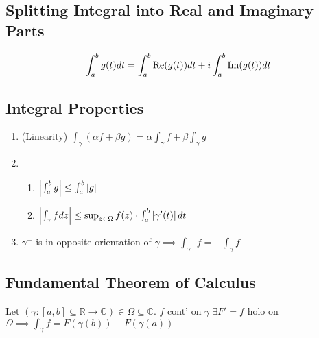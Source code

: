 \subsection{Splitting Integral into Real and Imaginary Parts} %
\label{sub:splitting_integral_into_real_and_imaginary_parts}
\begin{equation*}
	\int_{a}^{b} g(t) dt = \int_{a}^{b} \operatorname{Re}(g(t)) dt + i \int_{a}^{b} \operatorname{Im}(g(t)) dt
\end{equation*}

\subsection{Integral Properties} %
\label{sub:integral_properties}
\begin{enumerate}
	\item (Linearity) $\int_{\gamma} (\alpha f + \beta g) = \alpha \int_{\gamma} f + \beta \int_{\gamma} g$
	\item \begin{enumerate}
		\item $\left|\int_{a}^{b} g\right| \leq \int_{a}^{b} \left|g\right|$
		\item $\left|\int_{\gamma} f dz\right| \leq \sup_{z \in \Omega} f(z) \cdot \int_{a}^{b} \left|\gamma'(t)\right| dt$
	\end{enumerate}
	\item $\gamma^-$ is in opposite orientation of $\gamma \implies \int_{\gamma^-} f = - \int_{\gamma} f$
\end{enumerate}

\subsection{Fundamental Theorem of Calculus} %
\label{sub:fundamental_theorem_of_calculus}
Let $(\gamma : [a, b] \subseteq \mathbb{R} \to \mathbb{C}) \in \Omega \subseteq \mathbb{C}$. $f$ cont' on $\gamma \; \exists F' = f$ holo on $\Omega \implies \int_{\gamma} f = F(\gamma(b)) - F(\gamma(a))$

